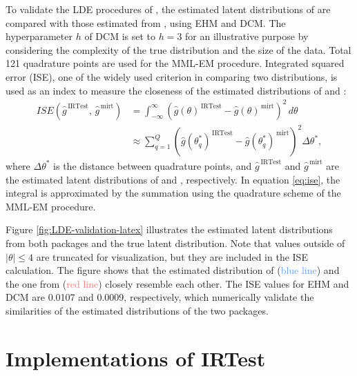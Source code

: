 To validate the LDE procedures of , the estimated latent
distributions of  are compared with those estimated
from , using EHM and DCM. The hyperparameter \(h\) of DCM is set to \(h=3\) for an
illustrative purpose by considering the complexity of the true distribution and
the size of the data. Total 121 quadrature points are used for the MML-EM
procedure. Integrated squared error (ISE), one of the widely used
criterion in comparing two distributions, is used as an index to measure
the closeness of the estimated distributions of  and 
\citep[for the usages of ISE, see][]{Jones:1991}:
\begin{equation}
\begin{split}
ISE{\left( \hat{g}^{\,\text{IRTest}}, \, \hat{g}^{\,\text{mirt}} \right)} &=
\int_{-\infty}^{\infty}{\left(
{\hat{g}(\theta)}^{\,\text{IRTest}} - {\hat{g}(\theta)}^{\,\text{mirt}}
\right)^2\, d\theta} \\
&\approx \sum_{q=1}^{Q}{\left(
{\hat{g}\left(\theta_{q}^{*}\right)}^{\,\text{IRTest}} - 
{\hat{g}\left(\theta_{q}^{*}\right)}^{\,\text{mirt}}
\right)^2 \Delta\theta^{*}},
\end{split}
\label{eq:ise}
\end{equation}
where \(\Delta\theta^{*}\) is the distance between quadrature points, and
\(\hat{g}^{\,\text{IRTest}}\) and \(\hat{g}^{\,\text{mirt}}\) are the estimated
latent distributions of  and , respectively.
In equation \eqref{eq:ise}, the integral is approximated by the summation
using the quadrature scheme of the MML-EM procedure.

Figure
\ref{fig:LDE-validation-latex}
illustrates the estimated latent
distributions from both packages and the true latent distribution. Note that
values outside of \(\left|\theta\right|\le4\) are truncated for visualization,
but they are included in the ISE calculation. The figure
shows that the estimated distribution of 
(\textcolor[HTML]{619CFF}{blue line})
and the one from 
(\textcolor[HTML]{F8766D}{red line})
closely resemble each other. The ISE values for EHM and DCM are
0.0107 and
0.0009, respectively,
which numerically validate the similarities of the estimated distributions
of the two packages.

\hypertarget{implementations-of-the-irtest}{%
\section{Implementations of IRTest}\label{implementations-of-the-irtest}}

